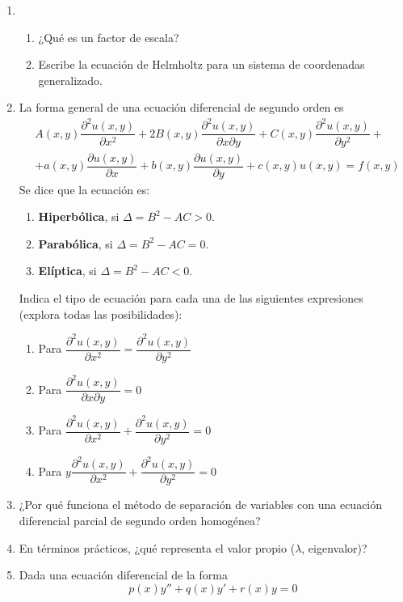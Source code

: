 \begin{enumerate}
\item \begin{enumerate} [label=\alph*)]
\item ¿Qué es un factor de escala?
\item Escribe la ecuación de Helmholtz para un sistema de coordenadas generalizado.
\end{enumerate}
\item La forma general de una ecuación diferencial de segundo orden es
\[ \begin{split} & A(x,y) \dfrac{\partial^{2} u(x,y)}{\partial x^{2}}  + 2B(x,y) \dfrac{\partial^{2} u(x,y)}{\partial x \partial y} + C(x,y) \dfrac{\partial^{2} u(x,y)}{\partial y^{2}} + \\
&+ a(x,y) \dfrac{\partial u(x,y)}{\partial x} + b(x,y) \dfrac{\partial u(x,y)}{\partial y} + c(x,y)u(x,y) = f(x,y) \end{split} \]
Se dice que la ecuación es:
\begin{enumerate} [label=\alph*)]
\item \textbf{Hiperbólica}, si $\Delta = B^{2} - AC > 0$.
\item \textbf{Parabólica}, si $\Delta = B^{2} - AC = 0$.
\item \textbf{Elíptica}, si $\Delta = B^{2} - AC < 0$.
\end{enumerate}
Indica el tipo de ecuación para cada una de las siguientes expresiones (explora todas las posibilidades):
\begin{enumerate}[label=\alph*)]
\item Para $ \dfrac{\partial^{2} u(x,y)}{\partial x^{2}} = \dfrac{\partial^{2} u(x,y)}{\partial y^{2}}$
\item Para $\dfrac{\partial^{2} u(x,y)}{\partial x \partial y} = 0$
\item Para $ \dfrac{\partial^{2} u(x,y)}{\partial x^{2}} + \dfrac{\partial^{2} u(x,y)}{\partial y^{2}} = 0$
\item Para $ y \dfrac{\partial^{2} u(x,y)}{\partial x^{2}} + \dfrac{\partial^{2} u(x,y)}{\partial y^{2}} = 0$
\end{enumerate}
\item ¿Por qué funciona el método de separación de variables con una ecuación diferencial parcial de segundo orden homogénea?
\item En términos prácticos, ¿qué representa el valor propio ($\lambda$, eigenvalor)?
\item Dada una ecuación diferencial de la forma
\[ p(x) y'' + q(x) y' + r(x) y = 0 \]

\end{enumerate}
